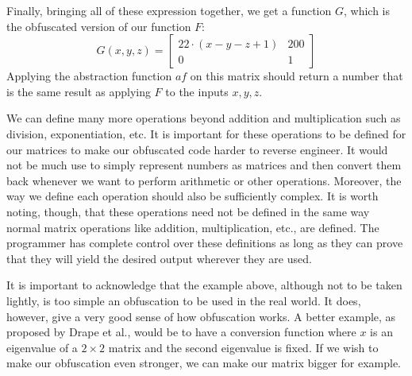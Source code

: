 Finally, bringing all of these expression together, we get a function $ G $,
which is the obfuscated version of our function $ F $:
\begin{equation*}
    G(x, y, z) =
    \begin{bmatrix}
        22 \cdot (x - y -z + 1) & 200 \\
        0 & 1
    \end{bmatrix}
\end{equation*}
Applying the abstraction function $ af $ on this matrix should return a number
that is
the same result as applying $ F $ to the inputs $ x, y, z $.

We can define many more operations beyond addition and multiplication such as
division, exponentiation, etc. It is important for
these operations to be defined for our matrices to make our obfuscated code
harder to reverse engineer. It would not be much use to simply represent
numbers as
matrices and then convert them back whenever we want to perform arithmetic or
other operations. Moreover, the way we define each operation should also be
sufficiently complex. It is worth noting, though, that these operations need
not be defined in the same way normal matrix operations like addition,
multiplication, etc., are defined. The programmer has complete control over
these definitions as long as they can prove that they will yield the desired
output wherever they are used.

It is important to acknowledge that the example above, although not to be taken
lightly, is too simple an
obfuscation to be used in the real world. It does, however, give a very good
sense of how
obfuscation works. A better example, as proposed by Drape et al., would be to
have a conversion function where $ x $ is an eigenvalue of a $ 2 \times 2 $
matrix and the second eigenvalue is fixed. If we wish to make our obfuscation
even stronger, we can make our matrix bigger for example.



